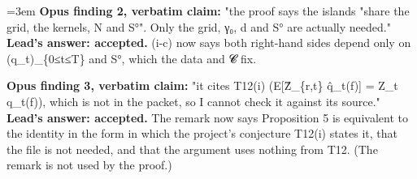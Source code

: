 \documentclass[11pt]{report}
\newenvironment{mdblock}{\begingroup\mdfont\raggedright\setlength{\parindent}{0pt}\setlength{\parskip}{0.55em}\emergencystretch=3em}{\par\endgroup}
\begin{document}
\begin{mdblock}
\textbf{Opus finding 2, verbatim claim:} "the proof says the islands "share the grid, the kernels, N and S°". Only the grid, γ₀, d and S° are actually needed." \textbf{Lead's answer: accepted.} (i-c) now says both right-hand sides depend only on (q\_t)\_\{0≤t≤T\} and S°, which the data and 𝓒 fix.

\textbf{Opus finding 3, verbatim claim:} "it cites T12(i) (E[Ẑ\_\{r,t\} q̂\_t(f)] = Z\_t q\_t(f)), which is not in the packet, so I cannot check it against its source." \textbf{Lead's answer: accepted.} The remark now says Proposition 5 is equivalent to the identity in the form in which the project's conjecture T12(i) states it, that the file is not needed, and that the argument uses nothing from T12. (The remark is not used by the proof.)
\end{mdblock}
\end{document}
